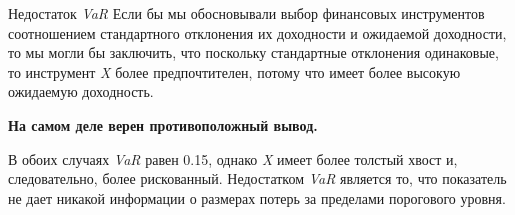 \documentclass[_fin_decisions_lectures.tex]{subfiles}
\begin{document}
\begin{frame}[ allowframebreaks ]{Недостаток \textit{VaR }}
Если бы мы обосновывали выбор финансовых инструментов соотношением стандартного отклонения их доходности и ожидаемой доходности, то мы могли бы заключить, что поскольку стандартные отклонения одинаковые, то инструмент \textit{X} более предпочтителен, потому что имеет более высокую ожидаемую доходность. 

\textbf{На самом деле верен противоположный вывод.}

\pagebreak
В обоих случаях \textit{VaR }равен 0.15, однако \textit{X }имеет более толстый хвост и, следовательно, более рискованный. Недостатком \textit{VaR }является то, что показатель не дает никакой информации о размерах потерь за пределами порогового уровня.

\end{frame}
\end{document}
